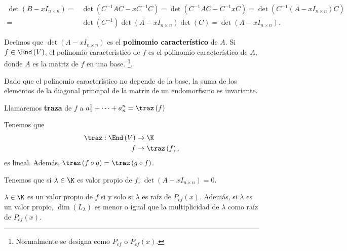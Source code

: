 \[
\begin{split}
	\det\left(B - x I_{n\times n}\right) = & \det\left(C^{-1}AC - xC^{-1}C\right) = \det\left(C^{-1}AC - C^{-1} x C\right) = \det\left(C^{-1}\left(A - x I_{n \times n}\right)C\right) \\
	= & \det\left(C^{-1}\right)\det\left(A - x I_{n \times n}\right) \det \left(C\right) = \det\left(A - x I_{n \times n}\right).
\end{split}
\]
\begin{fdefinition}
\normalfont Decimos que $\displaystyle \det\left(A - xI_{n \times n}\right) $ es el \textbf{polinomio característico} de $\displaystyle A $. Si $\displaystyle f \in \End\left(V\right) $, el polinomio característico de $\displaystyle f $ es el polinomio característico de $\displaystyle A $, donde $\displaystyle A $ es la matriz de $\displaystyle f $ en una base. \footnote{Normalmente se designa como $\displaystyle P_{cf} $ o $\displaystyle P_{cf}\left(x\right) $. }.
\end{fdefinition}
\begin{observation}
\normalfont Dado que el polinomio característico no depende de la base, la suma de los elementos de la diagonal principal de la matriz de un endomorfismo es invariante. 
\end{observation}
\begin{fdefinition}[]
\normalfont Llamaremos \textbf{traza} de $\displaystyle f $ a $\displaystyle a^{1}_{1} + \cdots + a^{n}_{n} = \traz\left(f\right) $ 
\end{fdefinition}
\begin{observation}
\normalfont Tenemos que 
\[
\begin{split}
	\traz : \End\left(V\right)  & \to \K \\
	f & \to \traz\left(f\right),
\end{split}
\]
es lineal. Además, $\displaystyle \traz\left(f \circ g\right) = \traz\left(g \circ f\right) $.
\end{observation}
\begin{observation}
\normalfont Tenemos que si $\displaystyle \lambda \in \K $ es valor propio de $\displaystyle f $, $\displaystyle \det\left(A - x I _{n \times n}\right) = 0 $.
\end{observation}
\begin{ftheorem}[]
\normalfont $\displaystyle \lambda \in \K $ es un valor propio de $\displaystyle f $ si y solo si $\displaystyle \lambda  $ es raíz de $\displaystyle P_{cf}\left(x\right) $. Además, si $\displaystyle \lambda  $ es un valor propio, $\displaystyle \dim\left(L_{\lambda }\right)  $ es menor o igual que la multiplicidad de $\displaystyle \lambda  $ como raíz de $\displaystyle P_{cf}\left(x\right) $.
\end{ftheorem}

